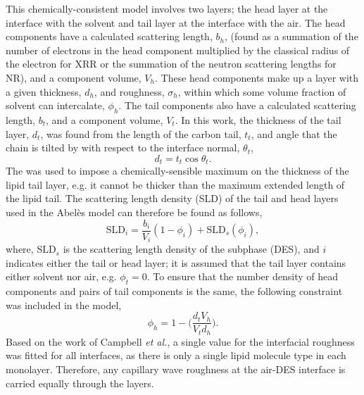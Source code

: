 \documentclass[twoside,twocolumn,9pt]{article}
\begin{document}
This chemically-consistent model involves two layers; the head layer at the interface with the solvent and tail layer at the interface with the air. The head components have a calculated scattering length, $b_h$, (found as a summation of the number of electrons in the head component multiplied by the classical radius of the electron for XRR or the summation of the neutron scattering lengths for NR), and a component volume, $V_h$. These head components make up a layer with a given thickness, $d_h$, and roughness, $\sigma_h$, within which some volume fraction of solvent can intercalate, $\phi_h$. The tail components also have a calculated scattering length, $b_t$, and a component volume, $V_t$. In this work, the thickness of the tail layer, $d_t$, was found from the length of the carbon tail, $t_t$, and angle that the chain is tilted by with respect to the interface normal, $\theta_t$,
%
\begin{equation}
\label{equ:tl}
d_t = t_t \cos{\theta_t}.
\end{equation}
%
The was used to impose a chemically-sensible maximum on the thickness of the lipid tail layer, e.g. it cannot be thicker than the maximum extended length of the lipid tail. The scattering length density (SLD) of the tail and head layers used in the Abel\`{e}s model can therefore be found as follows,
%
\begin{equation}
\text{SLD}_i = \frac{b_i}{V_i}(1 - \phi_i) + \text{SLD}_{s}(\phi_i),
\end{equation}
%
where, $\text{SLD}_{s}$ is the scattering length density of the subphase (DES), and $i$ indicates either the tail or head layer; it is assumed that the tail layer contains either solvent nor air, e.g. $\phi_t = 0$. To ensure that the number density of head components and pairs of tail components is the same, the following constraint was included in the model,\cite{Braun2017}
%
\begin{equation}
\label{equ:phih}
\phi_h =  1 - \bigg(\frac{d_tV_h}{V_td_h}\bigg).
\end{equation}
%
Based on the work of Campbell \emph{et al.},\cite{Campbell2018} a single value for the interfacial roughness was fitted for all interfaces, as there is only a single lipid molecule type in each monolayer. Therefore, any capillary wave roughness at the air-DES interface is carried equally through the layers.
\end{document}
